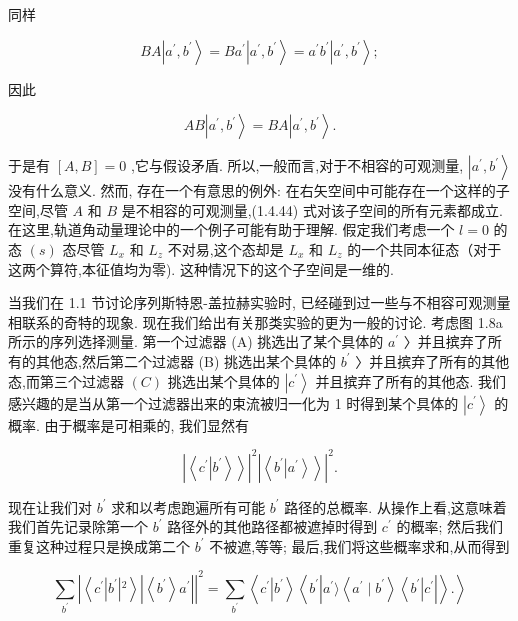 \documentclass[lang=cn,newtx,10pt,scheme=chinese,thmcnt=section]{elegantbook}
\begin{document}
同样

$$
{BA}\left| {{a}^{\prime },{b}^{\prime }}\right\rangle = B{a}^{\prime }\left| {{a}^{\prime },{b}^{\prime }}\right\rangle = {a}^{\prime }{b}^{\prime }\left| {{a}^{\prime },{b}^{\prime }}\right\rangle ; \tag{1.4.43}
$$

因此

$$
{AB}\left| {{a}^{\prime },{b}^{\prime }}\right\rangle = {BA}\left| {{a}^{\prime },{b}^{\prime }}\right\rangle . \tag{1.4.44}
$$

于是有 $\left\lbrack {A, B}\right\rbrack = 0$ ,它与假设矛盾. 所以,一般而言,对于不相容的可观测量, $\left| {{a}^{\prime },{b}^{\prime }}\right\rangle$ 没有什么意义. 然而, 存在一个有意思的例外: 在右矢空间中可能存在一个这样的子空间,尽管 $A$ 和 $B$ 是不相容的可观测量,(1.4.44) 式对该子空间的所有元素都成立. 在这里,轨道角动量理论中的一个例子可能有助于理解. 假定我们考虑一个 $l = 0$ 的态 $\left( s\right)$ 态尽管 ${L}_{x}$ 和 ${L}_{z}$ 不对易,这个态却是 ${L}_{x}$ 和 ${L}_{z}$ 的一个共同本征态（对于这两个算符,本征值均为零). 这种情况下的这个子空间是一维的.

当我们在 1.1 节讨论序列斯特恩-盖拉赫实验时, 已经碰到过一些与不相容可观测量相联系的奇特的现象. 现在我们给出有关那类实验的更为一般的讨论. 考虑图 1.8a 所示的序列选择测量. 第一个过滤器 (A) 挑选出了某个具体的 ${a}^{\prime }$ 〉并且摈弃了所有的其他态,然后第二个过滤器 (B) 挑选出某个具体的 ${b}^{\prime }$ 〉并且摈弃了所有的其他态,而第三个过滤器 $\left( C\right)$ 挑选出某个具体的 $\left| {c}^{\prime }\right\rangle$ 并且摈弃了所有的其他态. 我们感兴趣的是当从第一个过滤器出来的束流被归一化为 1 时得到某个具体的 $\left| {c}^{\prime }\right\rangle$ 的概率. 由于概率是可相乘的, 我们显然有

$$
{\left| \left\langle {c}^{\prime }\left| {b}^{\prime }\right\rangle \right\rangle \right| }^{2}{\left| \left\langle {b}^{\prime }\left| {a}^{\prime }\right\rangle \right\rangle \right| }^{2}. \tag{1.4.45}
$$

现在让我们对 ${b}^{\prime }$ 求和以考虑跑遍所有可能 ${b}^{\prime }$ 路径的总概率. 从操作上看,这意味着我们首先记录除第一个 ${b}^{\prime }$ 路径外的其他路径都被遮掉时得到 ${c}^{\prime }$ 的概率; 然后我们重复这种过程只是换成第二个 ${b}^{\prime }$ 不被遮,等等; 最后,我们将这些概率求和,从而得到

$$
\mathop{\sum }\limits_{{b}^{\prime }}{\left| \left\langle {c}^{\prime }\left| {b}^{\prime }\right| {}^{2}\right\rangle \left| \left\langle {b}^{\prime }\right\rangle {a}^{\prime }\right| \right| }^{2} = \mathop{\sum }\limits_{{b}^{\prime }}\left\langle {{c}^{\prime }\left| {b}^{\prime }\right\rangle \left\langle {{b}^{\prime }\left| {{a}^{\prime }\rangle \left\langle {{a}^{\prime } \mid {b}^{\prime }}\right\rangle \left\langle {b}^{\prime }\right| {c}^{\prime }}\right| }\right\rangle .}\right\rangle \tag{1.4.46}
$$
\end{document}

